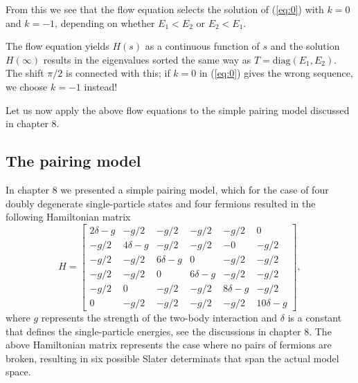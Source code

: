 From this we see that the flow equation selects the solution of (\ref{eq:0}) with
$k=0$ and $k=-1$, depending on whether  $E_1<E_2$ or $E_2<E_1$.

The flow equation yields $H(s)$ as a continuous function of $s$ and the solution
$H(\infty)$ results in the eigenvalues sorted the same way as
$T = \mathrm{diag}(E_1,E_2)$. The shift $\pi/2$ is connected with this; if $k=0$ in 
(\ref{eq:0}) gives the wrong sequence, we choose $k=-1$ instead!

Let us now apply the above flow equations to the simple pairing model discussed in chapter 8. 

\subsection{The pairing model}
In chapter 8 we presented a simple pairing model, which for the case of four doubly degenerate single-particle states and 
four fermions resulted in the following Hamiltonian matrix
 \[
  H = \begin{bmatrix}
  2\delta -g & -g/2 & -g/2 & -g/2 & -g/2 & 0 \\ -g/2 & 4\delta -g &
  -g/2 & -g/2 & -0 & -g/2 \\ -g/2 & -g/2 & 6\delta -g & 0 & -g/2 &
  -g/2 \\ -g/2 & -g/2 & 0 & 6\delta-g & -g/2 & -g/2 \\ -g/2 & 0 & -g/2
  & -g/2 & 8\delta-g & -g/2 \\ 0 & -g/2 & -g/2 & -g/2 & -g/2 &
  10\delta -g
  \end{bmatrix},
  \]
where $g$ represents the strength of the two-body interaction and $\delta$ is a constant that defines the single-particle energies, see the discussions in chapter 8.  The above Hamiltonian matrix represents the case where no pairs of fermions are broken, resulting in six possible Slater determinats that span the actual model space.

